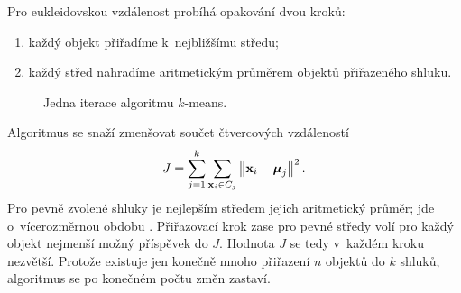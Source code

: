 Pro eukleidovskou vzdálenost probíhá opakování dvou kroků:
\begin{enumerate}
    \item každý objekt přiřadíme k~nejbližšímu středu;
    \item každý střed nahradíme aritmetickým průměrem objektů přiřazeného shluku.
\end{enumerate}

\begin{algorithm}
    \caption{\textsc{k-means}}
    \label{alg:ai-kmeans}
\end{algorithm}

\begin{figure}[ht]
    \centering
    
    \caption{Jedna iterace algoritmu \(k\)-means.}
    \label{fig:ai-kmeans}
\end{figure}

Algoritmus se snaží zmenšovat součet čtvercových vzdáleností
\[
    J
    =
    \sum_{j=1}^{k}
    \sum_{\mathbf{x}_i\in C_j}
    \left\lVert\mathbf{x}_i-\boldsymbol{\mu}_j\right\rVert^{2}.
\]
Pro pevně zvolené shluky je nejlepším středem jejich aritmetický průměr; jde o~vícerozměrnou obdobu
.
Přiřazovací krok zase pro pevné středy volí pro každý objekt nejmenší možný příspěvek do \(J\). Hodnota \(J\) se tedy v~každém kroku nezvětší. Protože existuje jen konečně mnoho přiřazení \(n\) objektů do \(k\) shluků, algoritmus se po konečném počtu změn zastaví.


